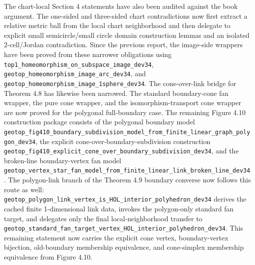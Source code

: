 \documentclass{article}
\begin{document}
The chart-local Section 4 statements have also been audited against the book
argument. The one-sided and three-sided chart contradictions now first extract
a relative metric ball from the local chart neighborhood and then delegate to
explicit small semicircle/small circle domain construction lemmas and an
isolated 2-cell/Jordan contradiction. Since the previous report, the
image-side wrappers have been proved from these narrower obligations using
\texttt{top1\_homeomorphism\_on\_subspace\_image\_dev34},
\texttt{geotop\_homeomorphism\_image\_arc\_dev34}, and
\texttt{geotop\_homeomorphism\_image\_1sphere\_dev34}. The cone-over-link
bridge for Theorem 4.8 has likewise been narrowed. The standard
boundary-cone fan wrapper, the pure cone wrapper, and the
isomorphism-transport cone wrapper are now proved for the polygonal
full-boundary case.
The remaining Figure 4.10 construction package consists of the polygonal
boundary model
\texttt{geotop\_fig410\_boundary\_subdivision\_model\_from\_finite\_linear\_graph\_polygon\_dev34},
the explicit cone-over-boundary-subdivision construction
\texttt{geotop\_fig410\_explicit\_cone\_over\_boundary\_subdivision\_dev34},
and the broken-line boundary-vertex fan model
\texttt{geotop\_vertex\_star\_fan\_model\_from\_finite\_linear\_link\_broken\_line\_dev34}.
The polygon-link branch of the Theorem 4.9 boundary converse now follows this
route as well: \texttt{geotop\_polygon\_link\_vertex\_is\_HOL\_interior\_polyhedron\_dev34}
derives the cached finite 1-dimensional link data, invokes the polygon-only
standard fan target, and delegates only the final local-neighborhood transfer to
\texttt{geotop\_standard\_fan\_target\_vertex\_HOL\_interior\_polyhedron\_dev34}.
This remaining statement now carries the explicit cone vertex, boundary-vertex
bijection, old-boundary membership equivalence, and cone-simplex membership
equivalence from Figure 4.10.
\end{document}
